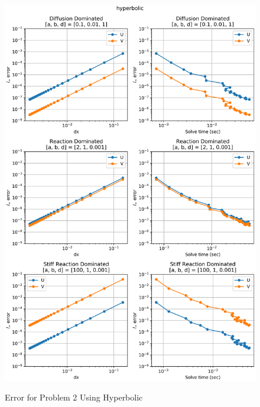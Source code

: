 \begin{figure}[t]
  \centering
  \includegraphics[width=5.75in]{images/hyperbolicproblem2.png}\\
  \caption{Error for Problem 2 Using Hyperbolic}
  \label{fig:errorProblem2hyperbolic}
\end{figure} 

